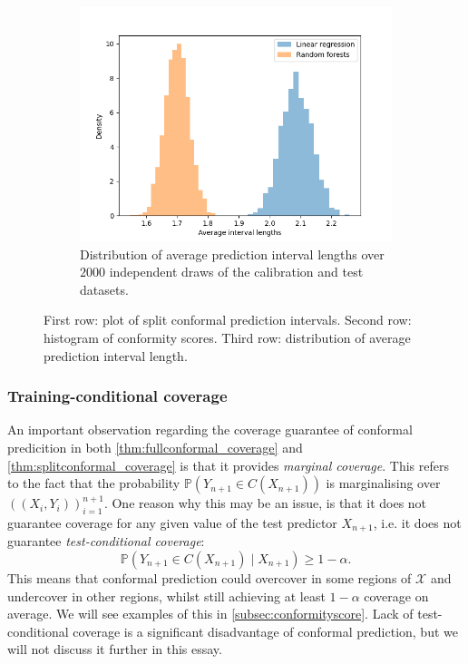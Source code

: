 \documentclass[11pt, titlepage]{article} %
\newcommand{\Prob}[1]{\mathbb{P}\left( #1 \right)}
\numberwithin{equation}{section}
\theoremstyle{definition}
\numberwithin{theorem}{section}
\numberwithin{lemma}{section}
\numberwithin{corollary}{section}
\numberwithin{proposition}{section}
\numberwithin{definition}{section}
\numberwithin{remark}{section}
\begin{document}
\begin{figure}[H]
\begin{subfigure}{0.49\textwidth}
        \includegraphics[width=\linewidth]{figures/2_3_lens.png}    
        \caption{Distribution of average prediction interval lengths over \(2000\) independent draws of the calibration and test datasets.} \label{fig:2_3_lens}
    \end{subfigure}
    \caption{First row: plot of split conformal prediction intervals. Second row: histogram of conformity scores. Third row: distribution of average prediction interval length.}
\label{fig:2_3_example}
\end{figure}


\subsubsection{Training-conditional coverage}
\label{subsubsec:training_conditional_coverage}

An important observation regarding the coverage guarantee of conformal predicition in both \cref{thm:fullconformal_coverage} and \cref{thm:splitconformal_coverage} is that it provides \textit{marginal coverage}. This refers to the fact that the probability \(\Prob{Y_{n+1} \in C(X_{n+1})}\) is marginalising over \(((X_i, Y_i))_{i=1}^{n+1}.\) One reason why this may be an issue, is that it does not guarantee coverage for any given value of the test predictor \(X_{n+1}\), i.e. it does not guarantee \textit{test-conditional coverage}: \[\Prob{Y_{n+1} \in C(X_{n+1}) \mid X_{n+1}} \geq 1- \alpha.\] This means that conformal prediction could overcover in some regions of \(\mathcal{X}\) and undercover in other regions, whilst still achieving at least \(1-\alpha\) coverage on average. We will see examples of this in \cref{subsec:conformityscore}. Lack of test-conditional coverage is a significant disadvantage of conformal prediction, but we will not discuss it further in this essay. \vskip5pt
\end{document}
